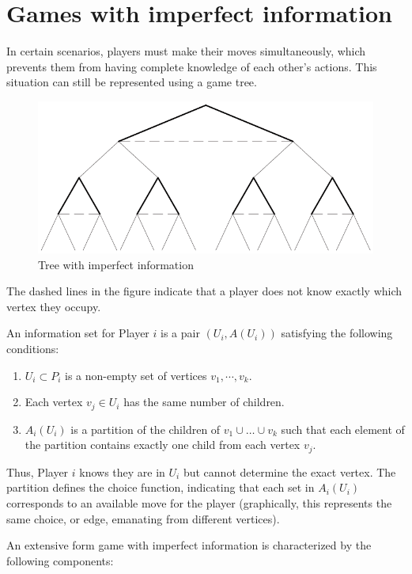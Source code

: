 \section{Games with imperfect information}

In certain scenarios, players must make their moves simultaneously, which prevents them from having complete knowledge of each other's actions. 
This situation can still be represented using a game tree.
\begin{figure}[H]
    \centering
    \includegraphics[width=0.75\linewidth]{images/tree3.png}
    \caption{Tree with imperfect information}
\end{figure}
The dashed lines in the figure indicate that a player does not know exactly which vertex they occupy.
\begin{definition}
    An information set for Player $i$ is a pair $(U_i, A(U_i))$ satisfying the following conditions: 
\end{definition}
\begin{enumerate}
    \item $U_i \subset P_i$ is a non-empty set of vertices $v_1, \cdots, v_k$.
    \item Each vertex $v_j\in U_i$ has the same number of children.
    \item $A_i(U_i)$ is a partition of the children of $v_1 \cup \dots \cup v_k$ such that each element of the partition contains exactly one child from each vertex $v_j$.
\end{enumerate}
Thus, Player $i$ knows they are in $U_i$ but cannot determine the exact vertex.
The partition defines the choice function, indicating that each set in $A_i(U_i)$ corresponds to an available move for the player (graphically, this represents the same choice, or edge, emanating from different vertices).
\begin{definition}
    An extensive form game with imperfect information is characterized by the following components:
\end{definition}
